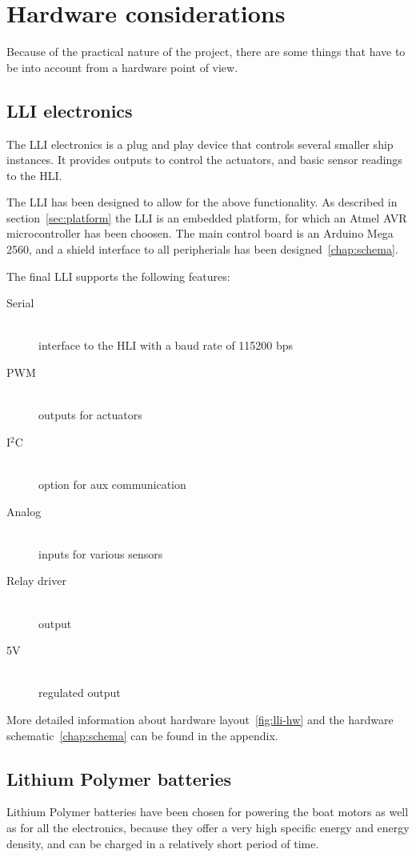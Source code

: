 \chapter{Hardware considerations}

Because of the practical nature of the project, there are some things that have to be into account from a hardware point of view.

\section{LLI electronics}
The \ac{LLI} electronics is a plug and play device that controls several smaller ship instances. It provides outputs to control the actuators, and basic sensor readings to the \ac{HLI}.

The \ac{LLI} has been designed to allow for the above functionality. As described in section~\vref{sec:platform} the \ac{LLI} is an embedded platform, for which an Atmel AVR microcontroller has been choosen. The main control board is an Arduino Mega 2560, and a shield interface to all peripherials has been designed~\vref{chap:schema}.

The final LLI supports the following features:
\begin{description}
\item[Serial]\hfill \\ interface to the \ac{HLI} with a baud rate of 115200 bps
\item[PWM]\hfill \\ outputs for actuators
\item[I$^2$C]\hfill \\ option for aux communication
\item[Analog]\hfill \\ inputs for various sensors
\item[Relay driver]\hfill \\ output
\item[5V]\hfill \\ regulated output
\end{description}

More detailed information about hardware layout~\vref{fig:lli-hw} and the hardware schematic~\vref{chap:schema} can be found in the appendix.

\section{Lithium Polymer batteries}

	Lithium Polymer batteries have been chosen for powering the boat motors as well as for all the electronics, because they offer a very high specific energy and energy density, and can be charged in a relatively short period of time. 

